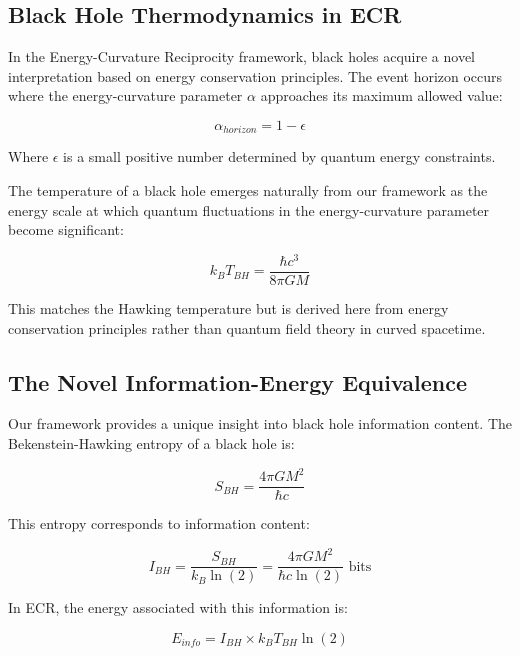 \documentclass[11pt,a4paper]{article}
\begin{document}
\subsection{Black Hole Thermodynamics in ECR}

In the Energy-Curvature Reciprocity framework, black holes acquire a novel interpretation based on energy conservation principles. The event horizon occurs where the energy-curvature parameter $\alpha$ approaches its maximum allowed value:

\begin{equation}
    \alpha_{horizon} = 1 - \epsilon
\end{equation}

Where $\epsilon$ is a small positive number determined by quantum energy constraints.

The temperature of a black hole emerges naturally from our framework as the energy scale at which quantum fluctuations in the energy-curvature parameter become significant:

\begin{equation}
    k_B T_{BH} = \frac{\hbar c^3}{8\pi GM}
\end{equation}

This matches the Hawking temperature but is derived here from energy conservation principles rather than quantum field theory in curved spacetime.

\subsection{The Novel Information-Energy Equivalence}

Our framework provides a unique insight into black hole information content. The Bekenstein-Hawking entropy of a black hole is:

\begin{equation}
    S_{BH} = \frac{4\pi GM^2}{\hbar c}
\end{equation}

This entropy corresponds to information content:

\begin{equation}
    I_{BH} = \frac{S_{BH}}{k_B \ln(2)} = \frac{4\pi GM^2}{\hbar c \ln(2)} \text{ bits}
\end{equation}

In ECR, the energy associated with this information is:

\begin{equation}
    E_{info} = I_{BH} \times k_B T_{BH} \ln(2)
\end{equation}
\end{document}
